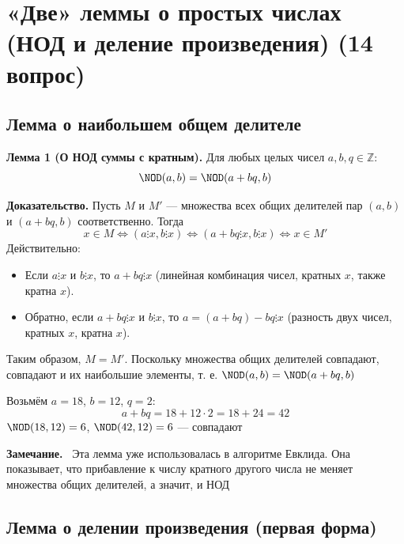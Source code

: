 \documentclass[a4paper,12pt]{article}
\newcommand{\myremark}{\textbf{Замечание.}\ }
\theoremstyle{definition}
\theoremstyle{plain}
\theoremstyle{remark}
\begin{document}
	
	
	
	

	
	\newpage
	\section{«Две» леммы о простых числах (НОД и деление произведения) (14 вопрос)}
	
	\subsection{Лемма о наибольшем общем делителе}
	
	\noindent \textbf{Лемма 1 (О НОД суммы с кратным).}
	Для любых целых чисел $a, b, q \in \mathbb{Z}$:
	\[
	\NOD(a, b) = \NOD(a + bq, b)
	\]
	
	\medskip
	\noindent \textbf{Доказательство.}
	Пусть $M$ и $M'$ — множества всех общих делителей пар $(a, b)$ и $(a + bq, b)$ соответственно.
	Тогда
	\[
	x \in M \iff (a \vdots x, b \vdots x) \iff (a + bq \vdots x, b \vdots x) \iff x \in M'
	\]
	Действительно:
	\begin{itemize}
	\item Если $a \vdots x$ и $b \vdots x$, то $a + bq \vdots x$ (линейная комбинация чисел, кратных $x$, также кратна $x$).
	\item Обратно, если $a + bq \vdots x$ и $b \vdots x$, то $a = (a + bq) - bq \vdots x$ (разность двух чисел, кратных $x$, кратна $x$).
	\end{itemize}
	Таким образом, $M = M'$. Поскольку множества общих делителей совпадают, совпадают и их наибольшие элементы, т. е. $\NOD(a, b) = \NOD(a + bq, b)$
	
	\begin{tcolorbox}[colback=blue!5, colframe=blue!40!black, title=Пример]
	Возьмём $a = 18$, $b = 12$, $q = 2$:
	\[
	a + bq = 18 + 12 \cdot 2 = 18 + 24 = 42
	\]
	$\NOD(18, 12) = 6$, $\NOD(42, 12) = 6$ — совпадают
	\end{tcolorbox}
	
	\myremark
	Эта лемма уже использовалась в алгоритме Евклида. Она показывает, что прибавление к числу кратного другого числа не меняет множества общих делителей, а значит, и НОД
	
	\subsection{Лемма о делении произведения (первая форма)}
	
\end{document}
